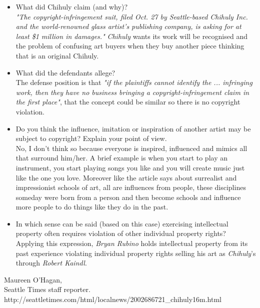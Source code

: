 \documentclass[11pt]{scrartcl}
\begin{document}
\begin{itemize}

	\item What did Chihuly claim (and why)?\\
	
		\emph{"The copyright-infringement suit, filed Oct. 27 by Seattle-based Chihuly Inc. and the world-renowned glass artist's publishing company, is asking for at least \$1 million in damages."}
		\emph{Chihuly} wants its work will be recognised and the problem of confusing art buyers when they buy another piece thinking that is an original Chihuly.
	\item What did the defendants allege?\\
	
		The defense position is that \emph{"if the plaintiffs cannot identify the ... infringing work, then they have no business bringing a copyright-infringement claim in the first place"}, that the concept could be similar so there is no copyright violation.
	\item Do you think the influence, imitation or inspiration of another artist may be subject to copyright? Explain your point of view.\\
	
		No, I don't think so because everyone is inspired, influenced and mimics all that surround him/her. A brief example is when you start to play an instrument, you start playing songs you like and you will create music just like the one you love. Moreover like the article says about surrealist and impressionist schools of art, all are influences from people, these disciplines someday were born from a person and then become schools and influence more people to do things like they do in the past.
		
	\item In which sense can be said (based on this case) exercising intellectual property often requires violation of other individual property rights?\\
	
		Applying this expression, \emph{Bryan Rubino} holds intellectual property from its past experience violating individual property rights selling his art as \emph{Chihuly}'s through \emph{Robert Kaindl}.
		
\end{itemize}

\begin{thebibliography}{9}

  Maureen O'Hagan,\\
  Seattle Times staff reporter.\\
  http://seattletimes.com/html/localnews/2002686721\_chihuly16m.html

\end{thebibliography}
\end{document}
